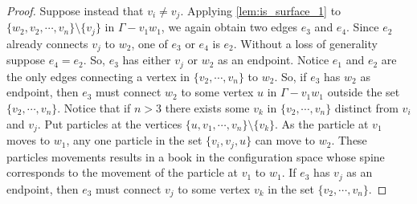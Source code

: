 \begin{proof}
    Suppose instead that \(v_i \neq v_j\).
    Applying \ref{lem:is_surface_1} to \(\{w_2, v_2, \cdots, v_n\}\setminus\{v_j\}\) in \(\Gamma - v_1 w_1\),
    we again obtain two edges \(e_3\) and \(e_4\).
    Since \(e_2\) already connects \(v_j\) to \(w_2\), one of \(e_3\) or \(e_4\) is \(e_2\).
    Without a loss of generality suppose \(e_4 = e_2\).
    So, \(e_3\) has either \(v_j\) or \(w_2\) as an endpoint.
    Notice \(e_1\) and \(e_2\) are the only edges connecting a vertex in \(\{v_2, \cdots, v_n\}\) to \(w_2\).
    So, if \(e_3\) has \(w_2\) as endpoint, then \(e_3\) must connect \(w_2\) to some vertex \(u\) in \(\Gamma - v_1 w_1\) outside the set \(\{v_2, \cdots, v_n\}\).
    Notice that if \(n > 3\) there exists some \(v_k\) in \(\{v_2, \cdots, v_n\}\) distinct from \(v_i\) and \(v_j\). Put 
    particles at the vertices \(\{u, v_1, \cdots, v_n\}\setminus\{v_k\}\). As the particle at \(v_1\) moves to \(w_1\),
    any one particle in the set \(\{v_i, v_j, u\}\) can move to \(w_2\). These particles movements results in a book
    in the configuration space whose spine corresponds to the movement of the particle at \(v_1\) to \(w_1\).
    If \(e_3\) has \(v_j\) as an endpoint, then \(e_3\) must connect \(v_j\) to some vertex \(v_k\) in the set \(\{v_2, \cdots, v_n\}\).


\end{proof}
